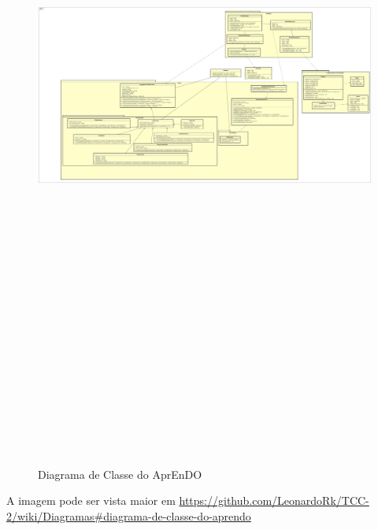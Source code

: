 \begin{landscape}
  \begin{figure}[H]
  \caption{Diagrama de Classe do AprEnDO}
  \includegraphics[width=249mm,height=240mm, keepaspectratio]{figuras/diagrama_classe.jpg}
  \label{fig:diagramaDeClasse}
  \end{figure}
\end{landscape}

A imagem pode ser vista maior em \url{https://github.com/LeonardoRk/TCC-2/wiki/Diagramas#diagrama-de-classe-do-aprendo}


